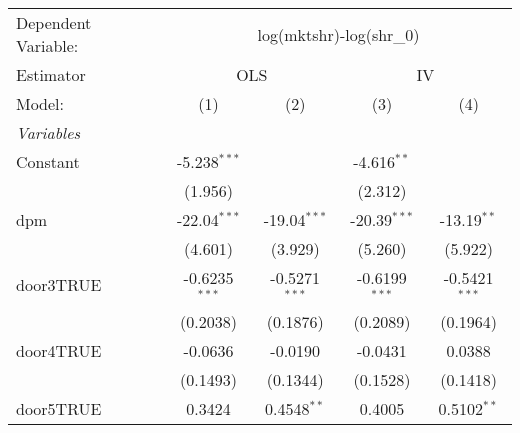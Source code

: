
\begingroup
\centering
\begin{tabular}{lcccc}
   \tabularnewline \midrule \midrule
   Dependent Variable:          & \multicolumn{4}{c}{log(mktshr)-log(shr\_0)}                                                                         \\
   Estimator                    & \multicolumn{2}{c}{OLS}                     & \multicolumn{2}{c}{IV}                                                \\
   Model:                       & (1)                                         & (2)                    & (3)                   & (4)                  \\
   \midrule
   \emph{Variables}                                                                                                                                   \\
   Constant                     & -5.238$^{***}$                              &                        & -4.616$^{**}$         &                      \\
                                & (1.956)                                     &                        & (2.312)               &                      \\
   dpm                          & -22.04$^{***}$                              & -19.04$^{***}$         & -20.39$^{***}$        & -13.19$^{**}$        \\
                                & (4.601)                                     & (3.929)                & (5.260)               & (5.922)              \\
   door3TRUE                    & -0.6235$^{***}$                             & -0.5271$^{***}$        & -0.6199$^{***}$       & -0.5421$^{***}$      \\
                                & (0.2038)                                    & (0.1876)               & (0.2089)              & (0.1964)             \\
   door4TRUE                    & -0.0636                                     & -0.0190                & -0.0431               & 0.0388               \\
                                & (0.1493)                                    & (0.1344)               & (0.1528)              & (0.1418)             \\
   door5TRUE                    & 0.3424                                      & 0.4548$^{**}$          & 0.4005                & 0.5102$^{**}$        \\

\end{tabular}
